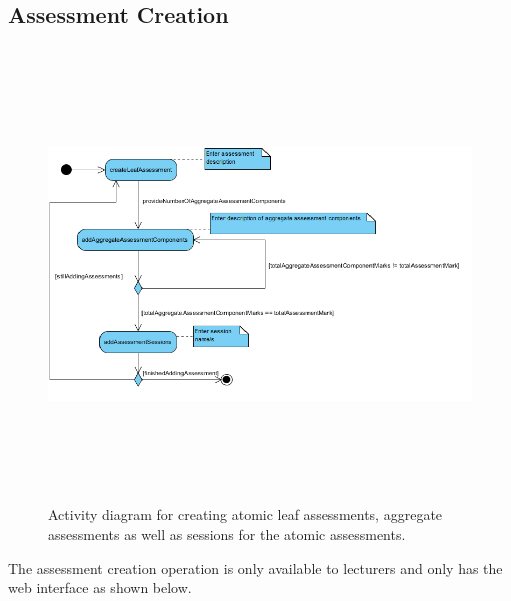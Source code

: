 \documentclass[12pt]{article}
\begin{document}
	\newpage
	\subsection{Assessment Creation}
	
		\begin{figure}[htbp]
		\centering
		\includegraphics[width=1.0\linewidth, height=12cm]{./Diagrams/uml_assessmentCreation}
		\caption{Activity diagram for creating atomic leaf assessments, aggregate assessments as well as sessions for the atomic assessments.}
		\label{fig:uml_assessmentCreation}
		\end{figure}
	
		The assessment creation operation is only available to lecturers and only has the web interface as shown below.
		
	\pagebreak
	\newpage	
\end{document}
